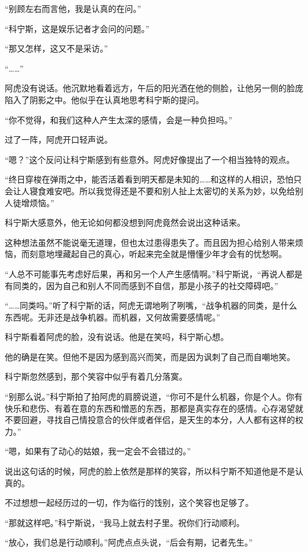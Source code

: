 “别顾左右而言他，我是认真的在问。”

“科宁斯，这是娱乐记者才会问的问题。”

“那又怎样，这又不是采访。”

“……”

阿虎没有说话。他沉默地看着远方，午后的阳光洒在他的侧脸，让他另一侧的脸庞陷入了阴影之中。他似乎在认真地思考科宁斯的提问。

“你不觉得，和我们这种人产生太深的感情，会是一种负担吗。”

过了一阵，阿虎开口轻声说。

“嗯？”这个反问让科宁斯感到有些意外。阿虎好像提出了一个相当独特的观点。

“终日穿梭在弹雨之中，能否活着看到明天都是未知的……和这样的人相识，恐怕只会让人寝食难安吧。所以我觉得还是不要和别人扯上太密切的关系为妙，以免给别人徒增烦恼。”

科宁斯大感意外，他无论如何都没想到阿虎竟然会说出这种话来。

这种想法虽然不能说毫无道理，但也太过患得患失了。而且因为担心给别人带来烦恼，而刻意地埋藏起自己的真心，听起来完全就是懵懂少年才会有的忧愁啊。

“人总不可能事先考虑好后果，再和另一个人产生感情啊。”科宁斯说，“再说人都是有同类的，因为自己和别人不同而感到不自信，那是小孩子的社交障碍吧。”

“……同类吗。”听了科宁斯的话，阿虎无谓地咧了咧嘴，“战争机器的同类，是什么东西呢。无非还是战争机器。而机器，又何故需要感情呢。”

科宁斯看着阿虎的脸，没有说话。他是在笑吗，科宁斯心想。

他的确是在笑。但他不是因为感到高兴而笑，而是因为讽刺了自己而自嘲地笑。

科宁斯忽然感到，那个笑容中似乎有着几分落寞。

“别那么说。”科宁斯拍了拍阿虎的肩膀说道，“你可不是什么机器，你是个人。你有快乐和悲伤、有着在意的东西和憎恶的东西，那都是真实存在的感情。心存渴望就不要回避，寻找自己情投意合的伙伴或者伴侣，是天生的本分，人人都有这样的权力。”

“嗯，如果有了动心的姑娘，我一定会不会错过的。”

说出这句话的时候，阿虎的脸上依然是那样的笑容，所以科宁斯不知道他是不是认真的。

不过想想一起经历过的一切，作为临行的饯别，这个笑容也足够了。

“那就这样吧。”科宁斯说，“我马上就去村子里。祝你们行动顺利。

“放心，我们总是行动顺利。”阿虎点点头说，“后会有期，记者先生。”